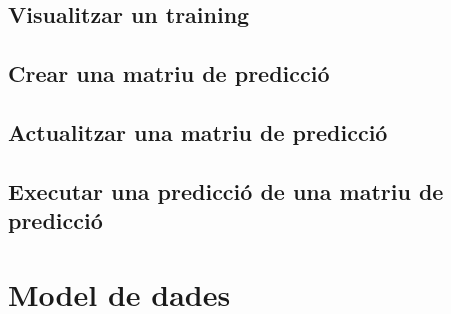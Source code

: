\subsection{Visualitzar un training}

\subsection{Crear una matriu de predicci\'{o}}

\subsection{Actualitzar una matriu de predicci\'{o}}

\subsection{Executar una predicci\'{o} de una matriu de predicci\'{o}}

\section{Model de dades}